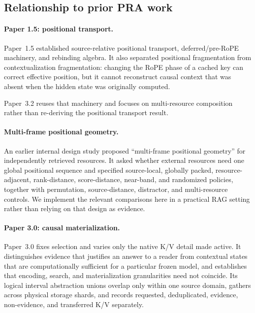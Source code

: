 \documentclass[11pt]{article}
\begin{document}
\subsection{Relationship to prior PRA work}

\paragraph{Paper 1.5: positional transport.}
Paper~1.5 established source-relative positional transport, deferred/pre-RoPE machinery, and rebinding algebra.  It also separated positional fragmentation from contextualization fragmentation: changing the RoPE phase of a cached key can correct effective position, but it cannot reconstruct causal context that was absent when the hidden state was originally computed.

Paper~3.2 reuses that machinery and focuses on multi-resource composition rather than re-deriving the positional transport result.

\paragraph{Multi-frame positional geometry.}
An earlier internal design study proposed ``multi-frame positional geometry''
for independently retrieved resources. It asked whether external resources
need one global positional sequence and specified source-local, globally
packed, resource-adjacent, rank-distance, score-distance, near-band, and
randomized policies, together with permutation, source-distance, distractor,
and multi-resource controls. We implement the relevant comparisons here in a
practical RAG setting rather than relying on that design as evidence.

\paragraph{Paper 3.0: causal materialization.}
Paper~3.0 fixes selection and varies only the native K/V detail made active. It
distinguishes evidence that justifies an answer to a reader from contextual
states that are computationally sufficient for a particular frozen model, and
establishes that encoding, search, and materialization granularities need not
coincide. Its logical interval abstraction unions overlap only within one
source domain, gathers across physical storage shards, and records requested,
deduplicated, evidence, non-evidence, and transferred K/V separately.
\end{document}
